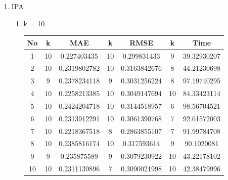 
\begin{enumerate}
    \item IPA
        \begin{enumerate}
            \item k = 10 \\
                \begingroup
                \renewcommand\arraystretch{1.5}
                    \begin{longtable}[H]{|c|c|c|c|c|c|c|}
                        \hline
                        No & k & MAE & k & RMSE & k & Time \\
                        \hline
                        1 & 10 & 0.227403435  & 10 & 0.299831433 & 9 & 39.32930207\\
                        \hline
                        2 & 10 & 0.2319802782  & 10 & 0.3163842676 & 8 & 44.21230698\\
                        \hline
                        3 & 9 & 0.2378234118 & 9 & 0.3031256224 & 8 & 97.19740295\\
                        \hline
                        4 & 10 & 0.2258213385 & 10 & 0.3049147694 & 10 & 84.33423114\\
                        \hline
                        5 & 10 & 0.2424204718 & 10 & 0.3144518957 & 6 & 98.56704521\\
                        \hline
                        6 & 10 & 0.2313912291 & 10 & 0.3061390768 & 7 & 92.61572003\\
                        \hline
                        7 & 10 & 0.2218367518 & 8 & 0.2863855107 & 7 & 91.99784708\\
                        \hline
                        8 & 10 & 0.2385816174 & 10 & 0.317593614 & 9 & 90.1020081\\
                        \hline
                        9 & 9 & 0.235875589 & 9 & 0.3079230922 & 10 & 43.22178102\\
                        \hline
                        10 & 10 & 0.2311139896 & 7 & 0.3090021998 & 10 & 42.38479996\\
                        \hline
                        

\end{longtable}
\end{enumerate}
\end{enumerate}
